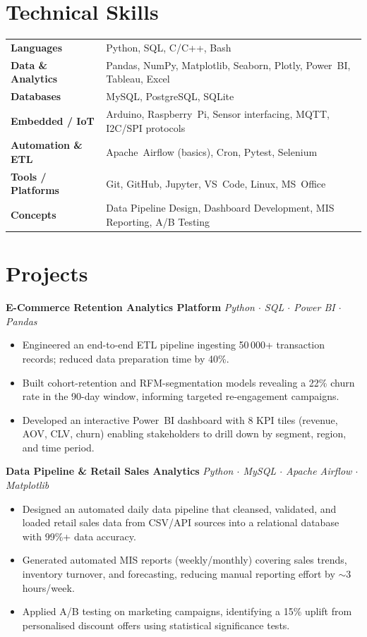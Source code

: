 \documentclass[10pt,a4paper]{article}
\newcommand{\projentry}[3]{%
  \noindent\textbf{#1} \hfill \textit{#2}
  \vspace{1pt}#3\vspace{4pt}
}
\begin{document}
\section{Technical Skills}
\begin{tabularx}{\linewidth}{@{}l X@{}}
  \textbf{Languages}        & Python, SQL, C/C++, Bash \\
  \textbf{Data \& Analytics}& Pandas, NumPy, Matplotlib, Seaborn, Plotly, Power~BI, Tableau, Excel \\
  \textbf{Databases}        & MySQL, PostgreSQL, SQLite \\
  \textbf{Embedded / IoT}   & Arduino, Raspberry~Pi, Sensor interfacing, MQTT, I2C/SPI protocols \\
  \textbf{Automation \& ETL}& Apache~Airflow (basics), Cron, Pytest, Selenium \\
  \textbf{Tools / Platforms}& Git, GitHub, Jupyter, VS~Code, Linux, MS~Office \\
  \textbf{Concepts}         & Data Pipeline Design, Dashboard Development, MIS Reporting, A/B Testing \\
\end{tabularx}

\section{Projects}

\projentry{E-Commerce Retention Analytics Platform}{Python $\cdot$ SQL $\cdot$ Power BI $\cdot$ Pandas}{
\begin{itemize}
  \item Engineered an end-to-end ETL pipeline ingesting 50\,000+ transaction records; reduced data
        preparation time by 40\%.
  \item Built cohort-retention and RFM-segmentation models revealing a 22\% churn rate in the
        90-day window, informing targeted re-engagement campaigns.
  \item Developed an interactive Power~BI dashboard with 8 KPI tiles (revenue, AOV, CLV, churn)
        enabling stakeholders to drill down by segment, region, and time period.
\end{itemize}
}

\projentry{Data Pipeline \& Retail Sales Analytics}{Python $\cdot$ MySQL $\cdot$ Apache Airflow $\cdot$ Matplotlib}{
\begin{itemize}
  \item Designed an automated daily data pipeline that cleansed, validated, and loaded retail sales
        data from CSV/API sources into a relational database with 99\%+ data accuracy.
  \item Generated automated MIS reports (weekly/monthly) covering sales trends, inventory turnover,
        and forecasting, reducing manual reporting effort by $\sim$3 hours/week.
  \item Applied A/B testing on marketing campaigns, identifying a 15\% uplift from personalised
        discount offers using statistical significance tests.
\end{itemize}
}
\end{document}
